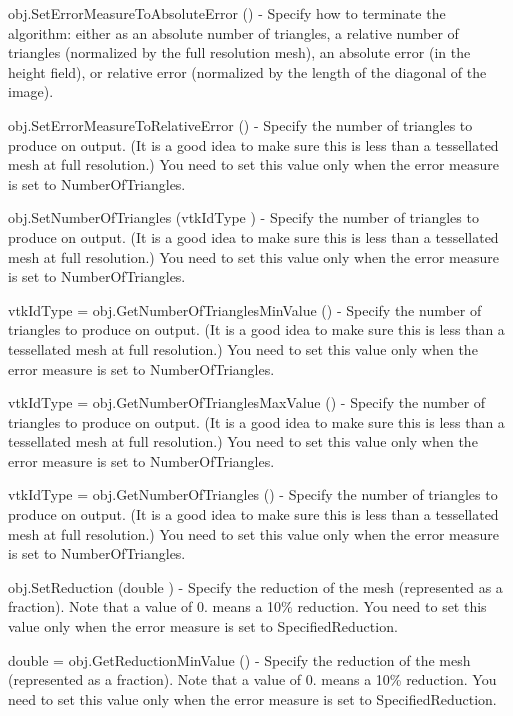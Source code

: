 \begin{DoxyItemize}
\item {\ttfamily obj.\-Set\-Error\-Measure\-To\-Absolute\-Error ()} -\/ Specify how to terminate the algorithm\-: either as an absolute number of triangles, a relative number of triangles (normalized by the full resolution mesh), an absolute error (in the height field), or relative error (normalized by the length of the diagonal of the image).  
\item {\ttfamily obj.\-Set\-Error\-Measure\-To\-Relative\-Error ()} -\/ Specify the number of triangles to produce on output. (It is a good idea to make sure this is less than a tessellated mesh at full resolution.) You need to set this value only when the error measure is set to Number\-Of\-Triangles.  
\item {\ttfamily obj.\-Set\-Number\-Of\-Triangles (vtk\-Id\-Type )} -\/ Specify the number of triangles to produce on output. (It is a good idea to make sure this is less than a tessellated mesh at full resolution.) You need to set this value only when the error measure is set to Number\-Of\-Triangles.  
\item {\ttfamily vtk\-Id\-Type = obj.\-Get\-Number\-Of\-Triangles\-Min\-Value ()} -\/ Specify the number of triangles to produce on output. (It is a good idea to make sure this is less than a tessellated mesh at full resolution.) You need to set this value only when the error measure is set to Number\-Of\-Triangles.  
\item {\ttfamily vtk\-Id\-Type = obj.\-Get\-Number\-Of\-Triangles\-Max\-Value ()} -\/ Specify the number of triangles to produce on output. (It is a good idea to make sure this is less than a tessellated mesh at full resolution.) You need to set this value only when the error measure is set to Number\-Of\-Triangles.  
\item {\ttfamily vtk\-Id\-Type = obj.\-Get\-Number\-Of\-Triangles ()} -\/ Specify the number of triangles to produce on output. (It is a good idea to make sure this is less than a tessellated mesh at full resolution.) You need to set this value only when the error measure is set to Number\-Of\-Triangles.  
\item {\ttfamily obj.\-Set\-Reduction (double )} -\/ Specify the reduction of the mesh (represented as a fraction). Note that a value of 0. means a 10\% reduction. You need to set this value only when the error measure is set to Specified\-Reduction.  
\item {\ttfamily double = obj.\-Get\-Reduction\-Min\-Value ()} -\/ Specify the reduction of the mesh (represented as a fraction). Note that a value of 0. means a 10\% reduction. You need to set this value only when the error measure is set to Specified\-Reduction.  

\end{DoxyItemize}
